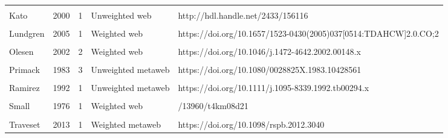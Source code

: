 \documentclass[
  12pt,
]{article}
\begin{document}
\begin{landscape}
\begin{longtable}[l]{lrlll}
\addlinespace
\cellcolor{gray!6}{Kaiser-Bunbury} & \cellcolor{gray!6}{2010} & \cellcolor{gray!6}{2} & \cellcolor{gray!6}{Weighted web} & \cellcolor{gray!6}{https://doi.org/10.1016/j.ppees.2009.04.001}\\
\addlinespace
Kato & 2000 & 1 & Unweighted web & http://hdl.handle.net/2433/156116\\
\addlinespace
\cellcolor{gray!6}{Kevan} & \cellcolor{gray!6}{1970} & \cellcolor{gray!6}{1} & \cellcolor{gray!6}{Unweighted web} & \cellcolor{gray!6}{https://doi.org/10.2307/2258569}\\
\addlinespace
Lundgren & 2005 & 1 & Weighted web & https://doi.org/10.1657/1523-0430(2005)037[0514:TDAHCW]2.0.CO;2\\
\addlinespace
\cellcolor{gray!6}{McMullen} & \cellcolor{gray!6}{1993} & \cellcolor{gray!6}{1} & \cellcolor{gray!6}{Unweighted metaweb} & \cellcolor{gray!6}{https://biostor.org/reference/244737}\\
\addlinespace
Olesen & 2002 & 2 & Weighted web & https://doi.org/10.1046/j.1472-4642.2002.00148.x\\
\addlinespace
\cellcolor{gray!6}{Peralta} & \cellcolor{gray!6}{2006} & \cellcolor{gray!6}{4} & \cellcolor{gray!6}{Weighted web} & \cellcolor{gray!6}{https://doi.org/10.1111/ele.13510}\\
\addlinespace
Primack & 1983 & 3 & Unweighted metaweb & https://doi.org/10.1080/0028825X.1983.10428561\\
\addlinespace
\cellcolor{gray!6}{Ramirez} & \cellcolor{gray!6}{1989} & \cellcolor{gray!6}{1} & \cellcolor{gray!6}{Unweighted web} & \cellcolor{gray!6}{https://doi.org/10.2307/2388282}\\
\addlinespace
Ramirez & 1992 & 1 & Unweighted metaweb & https://doi.org/10.1111/j.1095-8339.1992.tb00294.x\\
\addlinespace
\cellcolor{gray!6}{Robertson} & \cellcolor{gray!6}{1929} & \cellcolor{gray!6}{1} & \cellcolor{gray!6}{Unweighted metaweb} & \cellcolor{gray!6}{https://doi.org/10.5962/bhl.title.11538}\\
\addlinespace
Small & 1976 & 1 & Weighted web & /13960/t4km08d21\\
\addlinespace
\cellcolor{gray!6}{Souza} & \cellcolor{gray!6}{2017} & \cellcolor{gray!6}{1} & \cellcolor{gray!6}{Weighted web} & \cellcolor{gray!6}{https://doi.org/10.1111/1365-2745.12978}\\
\addlinespace
Traveset & 2013 & 1 & Weighted metaweb & https://doi.org/10.1098/rspb.2012.3040\\*
\end{longtable}
\endgroup{}

\end{landscape}
\end{document}
